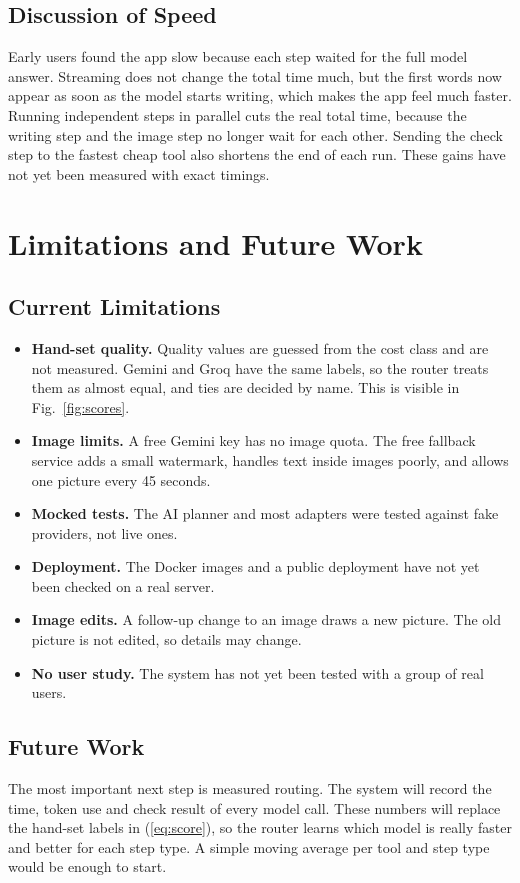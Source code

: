 \documentclass[conference]{IEEEtran}
\begin{document}
\subsection{Discussion of Speed}
Early users found the app slow because each step waited for the full model answer. Streaming does not
change the total time much, but the first words now appear as soon as the model starts writing, which
makes the app feel much faster. Running independent steps in parallel cuts the real total time, because
the writing step and the image step no longer wait for each other. Sending the check step to the
fastest cheap tool also shortens the end of each run. These gains have not yet been measured with exact
timings.

\section{Limitations and Future Work}

\subsection{Current Limitations}
\begin{itemize}
\item \textbf{Hand-set quality.} Quality values are guessed from the cost class and are not measured.
Gemini and Groq have the same labels, so the router treats them as almost equal, and ties are decided by
name. This is visible in Fig.~\ref{fig:scores}.
\item \textbf{Image limits.} A free Gemini key has no image quota. The free fallback service adds a small
watermark, handles text inside images poorly, and allows one picture every 45 seconds.
\item \textbf{Mocked tests.} The AI planner and most adapters were tested against fake providers, not
live ones.
\item \textbf{Deployment.} The Docker images and a public deployment have not yet been checked on a real
server.
\item \textbf{Image edits.} A follow-up change to an image draws a new picture. The old picture is not
edited, so details may change.
\item \textbf{No user study.} The system has not yet been tested with a group of real users.
\end{itemize}

\subsection{Future Work}
The most important next step is measured routing. The system will record the time, token use and check
result of every model call. These numbers will replace the hand-set labels in (\ref{eq:score}), so the
router learns which model is really faster and better for each step type. A simple moving average per
tool and step type would be enough to start.
\end{document}
